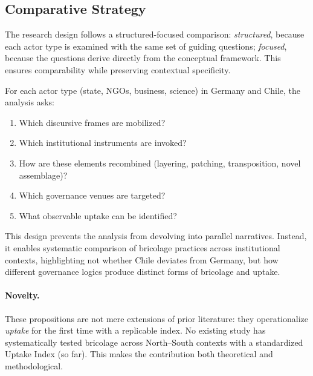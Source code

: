 \subsection*{Comparative Strategy}

The research design follows a structured-focused comparison:  
\textit{structured}, because each actor type is examined with the same set of guiding questions;  
\textit{focused}, because the questions derive directly from the conceptual framework.  
This ensures comparability while preserving contextual specificity.

For each actor type (state, NGOs, business, science) in Germany and Chile, the analysis asks:

\begin{enumerate}
    \item Which discursive frames are mobilized? 
    \item Which institutional instruments are invoked? 
    \item How are these elements recombined (layering, patching, transposition, novel assemblage)? 
    \item Which governance venues are targeted? 
    \item What observable uptake can be identified? 
\end{enumerate}

This design prevents the analysis from devolving into parallel narratives. 
Instead, it enables systematic comparison of bricolage practices across institutional contexts, 
highlighting not whether Chile deviates from Germany, but how different governance logics 
produce distinct forms of bricolage and uptake.

\paragraph{Novelty.} 
These propositions are not mere extensions of prior literature: they operationalize 
\emph{uptake} for the first time with a replicable index. No existing study has systematically 
tested bricolage across North–South contexts with a standardized Uptake Index (so far). 
This makes the contribution both theoretical and methodological.